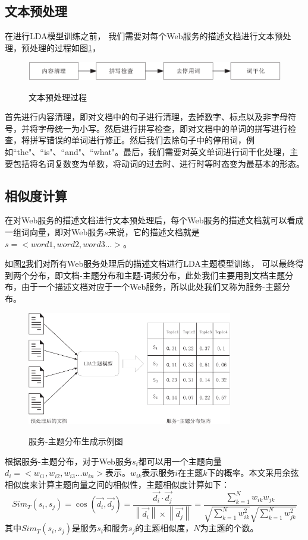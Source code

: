 \documentclass[master,winfonts]{njuthesis}
\begin{document}
\subsection{文本预处理}
在进行LDA模型训练之前， 我们需要对每个Web服务的描述文档进行文本预处理，预处理的过程如图\ref{fig:3-12}，
\begin{figure}[htbp]
  \centering
  \includegraphics[width=\textwidth]{file_pre.eps}\\
  \caption{文本预处理过程}\label{fig:3-12}
\end{figure}
首先进行内容清理，即对文档中的句子进行清理，去掉数字、标点以及非字母符号，并将字母统一为小写。然后进行拼写检查，即对文档中的单词的拼写进行检查，将拼写错误的单词进行修正。然后我们去除句子中的停用词，例如``the"、``is"、``and"、``what"。最后，我们需要对英文单词进行词干化处理，主要包括将名词复数变为单数，将动词的过去时、进行时等时态变为最基本的形态。

\subsection{相似度计算}
在对Web服务的描述文档进行文本预处理后，每个Web服务的描述文档就可以看成一组词向量，即对Web服务$s$来说，它的描述文档就是$s = <word1,word2,word3...>$。

如图\ref{fig:12}我们对所有Web服务处理后的描述文档进行LDA主题模型训练， 可以最终得到两个分布，即文档-主题分布和主题-词频分布，此处我们主要用到文档主题分布，由于一个描述文档对应于一个Web服务，所以此处我们又称为服务-主题分布。
\begin{figure}[htbp]
  \centering
  \includegraphics[width=0.8\textwidth]{LDAmatrix.eps}\\
  \caption{服务-主题分布生成示例图}\label{fig:12}
\end{figure}
根据服务-主题分布，对于Web服务$s_i$都可以用一个主题向量$d_i=<w_{i1},w_{i2},w_{i3}...w_{in}>$表示。$w_{ik}$表示服务$i$在主题$k$下的概率。本文采用余弦相似度来计算主题向量之间的相似性，主题相似度计算如下：
\begin{equation}
Sim_T(s_i,s_j)=\cos(\vec{d_i},\vec{d_j}) =\frac{\vec{d_i}\cdot \vec{d_j}}{\left \| \vec{d_i} \right \|\times \left \| \vec{d_j} \right \|}=\frac{\sum\limits_{k=1}^N w_{ik}w_{jk}}{\sqrt{\sum\limits_{k=1}^Nw_{ik}^{2}}\sqrt{\sum\limits_{k=1}^Nw_{jk}^{2}}}
\end{equation}
其中$Sim_T(s_i,s_j)$是服务$s_i$和服务$s_j$的主题相似度，$N$为主题的个数。
\end{document}
